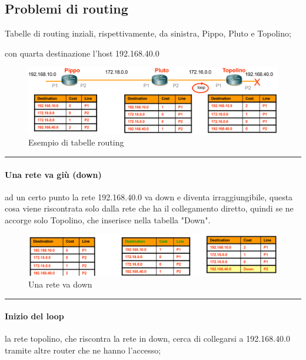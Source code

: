 \newpage

\subsection{Problemi di routing}
Tabelle di routing inziali, rispettivamente, da sinistra, Pippo, Pluto e Topolino; 

con quarta destinazione l'host 192.168.40.0

\begin{figure}[h!]
    \centering
    \includegraphics[width=1\textwidth]{images/problemaloop.png}
    \caption{Esempio di tabelle routing}
    \label{fig:problemaloop}
\end{figure}

\vspace{0.5em}
\noindent\rule{\linewidth}{0.4pt}
\vspace{0.5em}

\paragraph{Una rete va giù (down)} ad un certo punto la rete 192.168.40.0 va down e diventa irraggiungibile, questa cosa viene riscontrata solo dalla rete che ha il collegamento diretto, quindi se ne accorge solo Topolino, che inserisce nella tabella "Down".

\begin{figure}[h!]
    \centering
    \includegraphics[width=1\textwidth]{images/loop1.png}
    \caption{Una rete va down}
    \label{fig:problemaloop1}
\end{figure}

\vspace{0.5em}
\noindent\rule{\linewidth}{0.4pt}
\vspace{0.5em}

\paragraph{Inizio del loop} la rete topolino, che riscontra la rete in down, cerca di collegarsi a 192.168.40.0 tramite altre router che ne hanno l'accesso;

